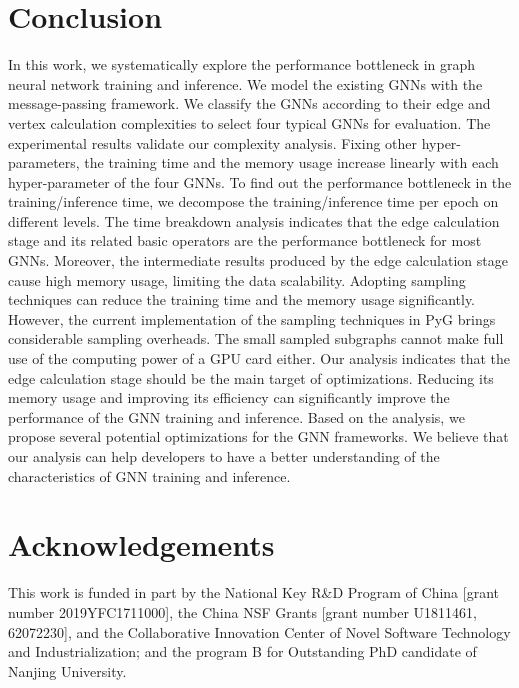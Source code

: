 \section{Conclusion}
\label{sec:conclusion}

In this work, we systematically explore the performance bottleneck in graph neural network training and inference. 
We model the existing GNNs with the message-passing framework. 
We classify the GNNs according to their edge and vertex calculation complexities to select four typical GNNs for evaluation. 
The experimental results validate our complexity analysis. Fixing other hyper-parameters, the training time and the memory usage increase linearly with each hyper-parameter of the four GNNs. 
To find out the performance bottleneck in the training/inference time, we decompose the training/inference time per epoch on different levels. 
The time breakdown analysis indicates that the edge calculation stage and its related basic operators are the performance bottleneck for most GNNs. 
Moreover, the intermediate results produced by the edge calculation stage cause high memory usage, limiting the data scalability. 
Adopting sampling techniques can reduce the training time and the memory usage significantly. 
However, the current implementation of the sampling techniques in PyG brings considerable sampling overheads. 
The small sampled subgraphs cannot make full use of the computing power of a GPU card either. 
Our analysis indicates that the edge calculation stage should be the main target of optimizations. 
Reducing its memory usage and improving its efficiency can significantly improve the performance of the GNN training and inference. 
Based on the analysis, we propose several potential optimizations for the GNN frameworks. 
We believe that our analysis can help developers to have a better understanding of the characteristics of GNN training and inference.

\section*{Acknowledgements}

This work is funded in part by the National Key R\&D Program of China [grant number 2019YFC1711000], the China NSF Grants [grant number U1811461, 62072230], and the Collaborative Innovation Center of Novel Software Technology and Industrialization; and the program B for Outstanding PhD candidate of Nanjing University.
